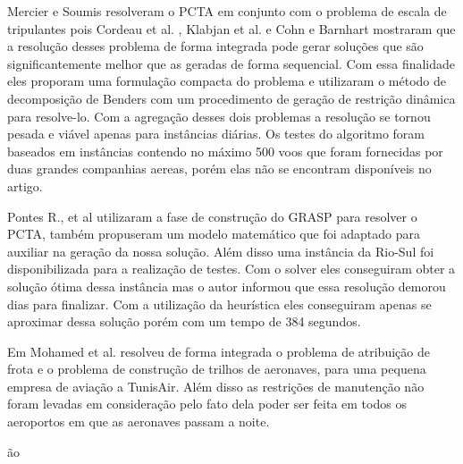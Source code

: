 		
		Mercier e Soumis \cite{mercier2007} resolveram o PCTA em conjunto com
		o problema de escala de tripulantes pois Cordeau et al. \cite{cordeau2001},
		Klabjan et al. \cite{klabjan2002} e Cohn e Barnhart \cite{mainville2003}
		mostraram que a resolução desses problema de forma integrada pode gerar
		soluções que são significantemente melhor que as geradas de forma sequencial.
		Com essa finalidade eles proporam uma formulação compacta do problema e
		utilizaram o método de decomposição de Benders com um procedimento de geração
		de restrição dinâmica para resolve-lo. Com a agregação desses dois problemas a
		resolução se tornou pesada e viável apenas para instâncias diárias. Os testes
		do algoritmo foram baseados em instâncias contendo no máximo 500 voos que
		foram fornecidas por duas grandes companhias aereas, porém elas não se
		encontram disponíveis no artigo.
		
		Pontes R., et al \cite{pontes2002} utilizaram a fase de construção do GRASP
		para resolver o PCTA, também propuseram um modelo matemático que foi
		adaptado para auxiliar na geração da nossa solução. Além disso uma instância
		da Rio-Sul foi disponibilizada para a realização de testes. Com o solver eles
		conseguiram obter a solução ótima dessa instância mas o autor informou que
		essa resolução demorou dias para finalizar. Com a utilização da heurística
		eles conseguiram apenas se aproximar dessa solução porém com um tempo de 384
		segundos.
		
		Em \cite{mohamed2011} Mohamed et al. resolveu de forma integrada o problema
		de atribuição de frota e o problema de construção de trilhos de aeronaves,
		para uma pequena empresa de aviação a TunisAir. Além disso as restrições de
		manutenção não foram levadas em consideração pelo fato dela poder ser feita
		em todos os aeroportos em que as aeronaves passam a noite.
		
ão